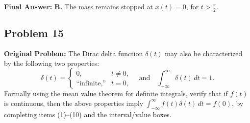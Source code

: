 \documentclass[11pt, letterpaper]{article}
\theoremstyle{definition}
\theoremstyle{remark}
\begin{document}
\textbf{Final Answer:}
\textbf{B.} The mass remains stopped at $x(t) = 0$, for $t > \frac{\pi}{2}$.

\subsection{Problem 15}
\textbf{Original Problem:}
The Dirac delta function $\delta(t)$ may also be characterized by the following two properties:
\[
    \delta(t) = \begin{cases} 0, & t \neq 0, \\ \text{``infinite,''} & t = 0, \end{cases} \quad \text{and} \quad \int_{-\infty}^{\infty} \delta(t)\,dt = 1.
\]
Formally using the mean value theorem for definite integrals, verify that if $f(t)$ is continuous, then the above properties imply $\int_{-\infty}^{\infty} f(t)\delta(t)\,dt = f(0)$, by completing items (1)--(10) and the interval/value boxes.
\end{document}
